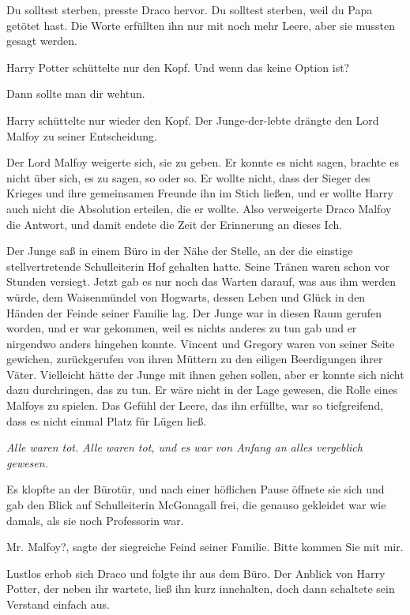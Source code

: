 \glqq{}Du solltest sterben\grqq{}, presste Draco hervor. \glqq{}Du solltest
sterben, weil du Papa getötet hast.\grqq{} Die Worte erfüllten ihn nur mit noch
mehr Leere, aber sie mussten gesagt werden.

Harry Potter schüttelte nur den Kopf. \glqq{}Und wenn das keine Option
ist?\grqq{}

\glqq{}Dann sollte man dir wehtun.\grqq{}

Harry schüttelte nur wieder den Kopf. Der Junge-der-lebte drängte den Lord
Malfoy zu seiner Entscheidung.

Der Lord Malfoy weigerte sich, sie zu geben. Er konnte es nicht sagen, brachte
es nicht über sich, es zu sagen, so oder so. Er wollte nicht, dass der Sieger
des Krieges und ihre gemeinsamen Freunde ihn im Stich ließen, und er wollte
Harry auch nicht die Absolution erteilen, die er wollte. Also verweigerte Draco
Malfoy die Antwort, und damit endete die Zeit der Erinnerung an dieses Ich.

Der Junge saß in einem Büro in der Nähe der Stelle, an der die einstige
stellvertretende Schulleiterin Hof gehalten hatte. Seine Tränen waren schon vor
Stunden versiegt. Jetzt gab es nur noch das Warten darauf, was aus ihm werden
würde, dem Waisenmündel von Hogwarts, dessen Leben und Glück in den Händen der
Feinde seiner Familie lag. Der Junge war in diesen Raum gerufen worden, und er
war gekommen, weil es nichts anderes zu tun gab und er nirgendwo anders hingehen
konnte. Vincent und Gregory waren von seiner Seite gewichen, zurückgerufen von
ihren Müttern zu den eiligen Beerdigungen ihrer Väter. Vielleicht hätte der
Junge mit ihnen gehen sollen, aber er konnte sich nicht dazu durchringen, das zu
tun. Er wäre nicht in der Lage gewesen, die Rolle eines Malfoys zu spielen. Das
Gefühl der Leere, das ihn erfüllte, war so tiefgreifend, dass es nicht einmal
Platz für Lügen ließ.

\emph{Alle waren tot. Alle waren tot, und es war von Anfang an alles vergeblich
gewesen.}

Es klopfte an der Bürotür, und nach einer höflichen Pause öffnete sie sich und
gab den Blick auf Schulleiterin McGonagall frei, die genauso gekleidet war wie
damals, als sie noch Professorin war.

\glqq{}Mr. Malfoy?\grqq{}, sagte der siegreiche Feind seiner Familie. \glqq{}Bitte
kommen Sie mit mir.\grqq{}

Lustlos erhob sich Draco und folgte ihr aus dem Büro. Der Anblick von Harry
Potter, der neben ihr wartete, ließ ihn kurz innehalten, doch dann schaltete
sein Verstand einfach aus.

